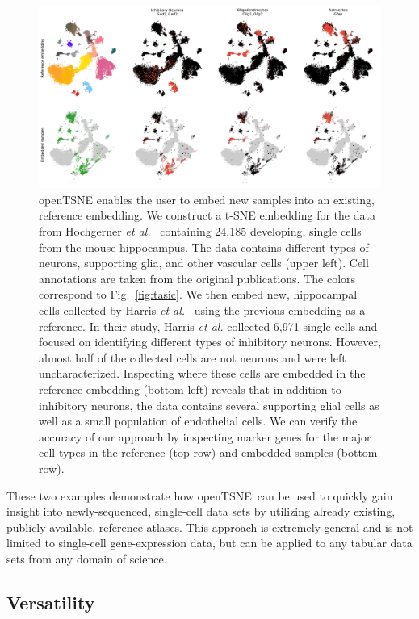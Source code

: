 \documentclass[twocolumn]{bmcart}
\newcommand{\opentsne}{\textsf{openTSNE}}
\begin{document}
\begin{figure}[htbp]
  \includegraphics[width=\textwidth]{transform_hochgerner}
  \caption{\label{fig:transform}openTSNE enables the user to embed new samples into an existing, reference embedding. We construct a t-SNE embedding for the data from Hochgerner \textit{et al.}~\cite{hochgerner2018conserved} containing 24,185 developing, single cells from the mouse hippocampus. The data contains different types of neurons, supporting glia, and other vascular cells (upper left). Cell annotations are taken from the original publications. The colors correspond to Fig.~\ref{fig:tasic}. We then embed new, hippocampal cells collected by Harris \textit{et al.}~\cite{harris2018classes} using the previous embedding as a reference. In their study, Harris \textit{et al.} collected 6,971 single-cells and focused on identifying different types of inhibitory neurons. However, almost half of the collected cells are not neurons and were left uncharacterized. Inspecting where these cells are embedded in the reference embedding (bottom left) reveals that in addition to inhibitory neurons, the data contains several supporting glial cells as well as a small population of endothelial cells. We can verify the accuracy of our approach by inspecting marker genes for the major cell types in the reference (top row) and embedded samples (bottom row).}
\end{figure}

These two examples demonstrate how \opentsne\ can be used to quickly gain insight into newly-sequenced, single-cell data sets by utilizing already existing, publicly-available, reference atlases. This approach is extremely general and is not limited to single-cell gene-expression data, but can be applied to any tabular data sets from any domain of science.

\subsection*{Versatility}
\end{document}

